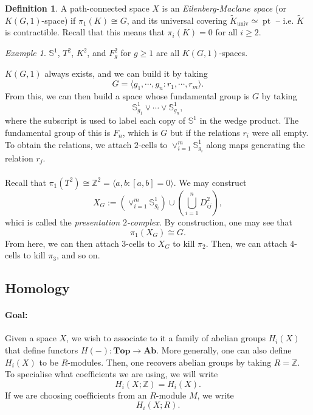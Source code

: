 \documentclass[a4paper]{report}
\theoremstyle{definition}
\newtheorem{definition}{Definition}
\theoremstyle{remark}
\theoremstyle{proposition}
\theoremstyle{conjecture}
\theoremstyle{lemma}
\theoremstyle{corollary}
\theoremstyle{exercise}
\newtheorem{example}{Example}
\newcommand{\on}{\operatorname}
\begin{document}
\begin{definition}
    A path-connected space $X$ is an \emph{Eilenberg-Maclane space} (or $K(G,1)$-space) if 
    $\pi_1(K) \cong G$, and its universal covering $\widetilde{K}_{\on{univ}} \simeq \on{pt}$ -- i.e. $\widetilde{K}$ is contractible.
    Recall that this means that $\pi_i(K) = 0$ for all $i \geq 2$.
\end{definition}

\begin{example}
    $\mathbb{S}^1$, $T^2$, $K^2$, and $F_g^2$ for $g \geq 1$ are all $K(G,1)$-spaces.
\end{example}

$K(G,1)$ always exists, and we can build it by taking $$G = \langle g_1,\cdots, g_n : r_1, \cdots, r_m\rangle.$$
From this, we can then build a space whose fundamental group is $G$ by taking 
$$\mathbb{S}^1_{g_1} \vee \cdots \vee \mathbb{S}^1_{g_n},$$ where the subscript is used to 
label each copy of $\mathbb{S}^1$ in the wedge product. The fundamental group of this is $F_n$, which is 
$G$ but if the relations $r_i$ were all empty. To obtain the relations, we attach $2$-cells to 
$\vee_{i=1}^m \mathbb{S}_{g_i}^1$ along maps generating the relation $r_j$.\\\\
Recall that $\pi_1(T^2) \cong \mathbb{Z}^2 = \langle a,b : [a,b] = 0\rangle$. We may construct 
$$X_G := \left(\vee_{i=1}^m \mathbb{S}^1_{g_i}\right) \cup \left(\bigcup_{i=1}^n D_{ij}^2\right),$$
whici is called the \emph{presentation $2$-complex}. By construction, one may see that 
$$\pi_1(X_G) \cong G.$$
From here, we can then attach $3$-cells to $X_G$ to kill $\pi_2$. Then, we can attach $4$-cells to kill $\pi_3$,
and so on.

\subsection{Homology}

\paragraph{Goal:} Given a space $X$, we wish to associate to it a family of abelian groups $H_i(X)$
that define functors $H(-) : \mathbf{Top} \to \mathbf{Ab}$. More generally, one can also define $H_i(X)$ 
to be $R$-modules. Then, one recovers abelian groups by taking $R = \mathbb{Z}$. To specialise what coefficients 
we are using, we will write $$H_i(X; \mathbb{Z}) = H_i(X).$$ If we are choosing coefficients from an 
$R$-module $M$, we write $$H_i(X;R).$$
\end{document}
